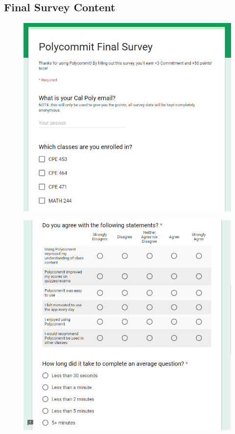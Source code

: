 
\begin{appendices}
\chapter{Final Survey Content}

\begin{figure}[h!]
	\includegraphics[width=1.0\linewidth]{figures/survey1}
	\label{fig:survey1}
\end{figure}

\begin{figure}[h!]
	\includegraphics[width=1.0\linewidth]{figures/survey2}
	\label{fig:survey2}
\end{figure}


\end{appendices}
